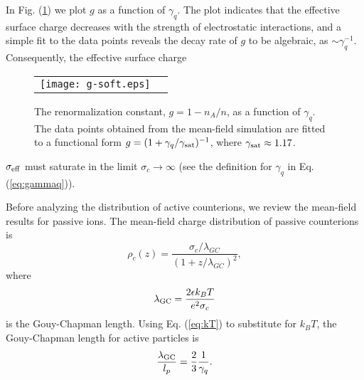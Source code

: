 \documentclass[pre,twocolumn,graphicx]{revtex4-1}
\newcommand{\be}{\begin{equation}}
\newcommand{\ee}{\end{equation}}
\begin{document}
In Fig. (\ref{fig:g}) we plot $g$ as a function of $\gamma_q$.  The plot indicates that the effective surface 
charge decreases with the strength of electrostatic interactions, and a simple fit to the data points reveals 
the decay rate of $g$ to be algebraic, as $\sim\gamma_q^{-1}$.  Consequently, the effective surface charge 
\graphicspath{{figures/}}
\begin{figure}[h] 
 \begin{center}
 \begin{tabular}{rr}
  \texttt{[image: g-soft.eps]}
 \end{tabular}
 \end{center}
\caption{The renormalization constant, $g=1-n_A/n$, as a function of $\gamma_q$.  The data points obtained 
from the mean-field simulation are fitted to a functional form $g=(1+\gamma_q/\gamma_{\rm sat})^{-1}$, where 
$\gamma_{\rm sat}\approx 1.17$.} 
\label{fig:g}
\end{figure}
$\sigma_{\rm eff}$ must saturate in the limit $\sigma_c\to\infty$ (see the definition for $\gamma_q$ in 
Eq. (\ref{eq:gammaq})).
















Before analyzing the distribution of active counterions, we review 
the mean-field results for passive ions.  The mean-field charge distribution of passive counterions is
\be
\rho_c(z) = \frac{\sigma_c/\lambda_{GC}}{(1 + z/\lambda_{GC})^2},
\label{eq:rho_pb}
\ee  
where 
\be
\lambda_{\rm GC} = \frac{2\epsilon k_BT}{e^2\sigma_c}
\label{eq:lambdaGC}
\ee  
is the Gouy-Chapman length.  Using Eq. (\ref{eq:kT}) to substitute for $k_BT$, 
the Gouy-Chapman length for active particles is 
\be
\frac{\lambda_{\rm GC}}{l_p} = \frac{2}{3}\frac{1}{\gamma_q}. 
\label{eq:lambdaGC2}
\ee  
\end{document}
